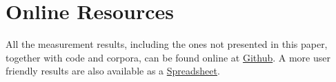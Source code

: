 \documentclass[sigconf]{acmart}
\begin{document}
\appendix

\section{Online Resources}

All the measurement results, including the ones not presented in this paper, together with code and corpora, can be found online at
{\color{blue}\href{https://github.com/ivlcic/trans-ner}{Github}}.
A more user friendly results are also available as a
{\color{blue}\href{https://docs.google.com/spreadsheets/d/16UaPR-qneNN8mlzjNkjc9kdry2eQl4J84t3EfDOtBj0/edit?usp=sharing}{Spreadsheet}}.
\end{document}
